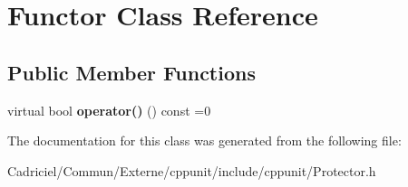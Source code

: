 \hypertarget{class_functor}{}\section{Functor Class Reference}
\label{class_functor}
\subsection*{Public Member Functions}
\begin{DoxyCompactItemize}
\item 
virtual bool {\bfseries operator()} () const  =0\hypertarget{class_functor_a36f20f712e6b220a924d524c05676849}{}\label{class_functor_a36f20f712e6b220a924d524c05676849}

\end{DoxyCompactItemize}


The documentation for this class was generated from the following file\+:\begin{DoxyCompactItemize}
\item 
Cadriciel/\+Commun/\+Externe/cppunit/include/cppunit/Protector.\+h\end{DoxyCompactItemize}
